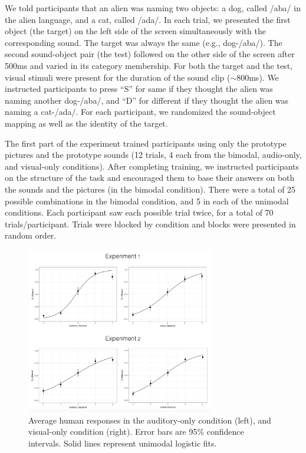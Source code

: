 \documentclass[10pt,letterpaper]{article}
\begin{document}
We told participants that an alien was naming two objects: a dog, called /aba/ in the alien language, and a cat, called /ada/. In each trial, we presented the first object (the target) on the left side of the screen simultaneously with the corresponding sound. The target was always the same (e.g., dog-/aba/). The second sound-object pair (the test) followed on the other side of the screen after 500ms and varied in its category membership. For both the target and the test, visual stimuli were present for the duration of the sound clip ($\sim$800ms). We instructed participants to press ``S'' for same if they thought the alien was naming another dog-/aba/, and ``D'' for different if they thought the alien was naming a cat-/ada/. For each participant, we randomized the sound-object mapping as well as the identity of the target.

The first part of the experiment trained participants using only the prototype pictures and the prototype sounds (12 trials, 4 each from the bimodal, audio-only, and visual-only conditions). After completing training, we instructed participants on the structure of the task and encouraged them to base their answers on both the sounds and the pictures (in the bimodal condition). There were a total of 25 possible combinations in the bimodal condition, and 5 in each of the unimodal conditions. Each participant saw each possible trial twice, for a total of 70 trials/participant. Trials were blocked by condition and blocks were presented in random order.

\begin{figure}
\centering
\includegraphics[width=3.25in]{unimodal.png}
\caption{Average human responses in the auditory-only condition (left), and visual-only condition (right). Error bars are 95\% confidence intervals. Solid lines represent unimodal logistic fits.}
\label{fig:unimodal}
\end{figure}
\end{document}
